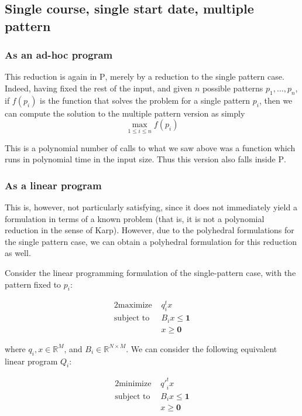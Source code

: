 \subsection{Single course, single start date, multiple pattern}

\subsubsection{As an ad-hoc program}
This reduction is again in \textsc{P}, merely by a reduction to the single pattern case. Indeed, having fixed the rest of the input, and given $n$ possible patterns $p_1, \dots, p_n$, if $f(p_i)$ is the function that solves the problem for a single pattern $p_i$, then we can compute the solution to the multiple pattern version as simply
$$
\max_{1 \le i \le n} f(p_i)
$$

This is a polynomial number of calls to what we saw above was a function which runs in polynomial time in the input size. Thus this version also falls inside \textsc{P}.

\subsubsection{As a linear program}
This is, however, not particularly satisfying, since it does not immediately yield a formulation in terms of a known problem (that is, it is not a polynomial reduction in the sense of Karp). However, due to the polyhedral formulations for the single pattern case, we can obtain a polyhedral formulation for this reduction as well.

Consider the linear programming formulation of the single-pattern case, with the pattern fixed to $p_i$:

\begin{alignat*}{2}
  \text{maximize } & q_i^t x \\
  \text{subject to } & B_i x \le \mathbf{1}\\
                     & x \ge \mathbf{0}
\end{alignat*}

where $q_i, x \in \mathbb{R}^M$, and $B_i \in \mathbb{R}^{N \times M}$. We can consider the following equivalent linear program $Q_i$:

\begin{alignat*}{2}
  \text{minimize } & {q'}_i^t x \\
  \text{subject to } & B_i x \le \mathbf{1}\\
                     & x \ge \mathbf{0}
\end{alignat*}

